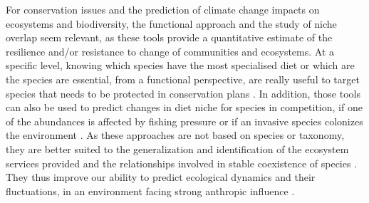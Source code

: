 For conservation issues and the prediction of climate change impacts on ecosystems and biodiversity, the functional approach and the study of niche overlap seem relevant, as these tools provide a quantitative estimate of the resilience and/or resistance to change of communities and ecosystems. 
 At a specific level, knowing which species have the most specialised diet or which are the species are essential, from a functional perspective, are really useful to target species that needs to be protected in conservation plans \citep{cooke2020,mejri2009,norton1995}. In addition, those tools can also be used to predict changes in diet niche for species in competition, if one of the abundances is affected by fishing pressure \citep{diderich2006} or if an invasive species colonizes the environment \citep{albouy2011,geange2011,nagelkerke2018}. As these approaches are not based on species or taxonomy, they are better suited to the generalization and identification of the ecosystem services provided \citep{martini2020,mcgill2006} and the relationships involved in stable coexistence of species \citep{albouy2011}. They thus improve our ability to predict ecological dynamics and their fluctuations, in an environment facing strong anthropic influence \citep{kremer2017}. 

